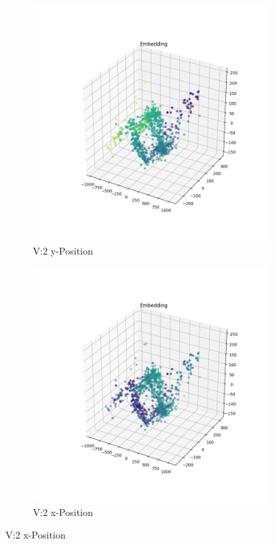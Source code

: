\begin{figure}[h]
	\begin{subfigure}[c]{0.49\textwidth}			
		\includegraphics[width=1\textwidth,center]{bilder/Hauptteil/MT_Grapple/EMB_alle/2_Embedding_y.png}
		\caption{V:2 y-Position}
		\label{img:Einbettung2_y}	
	\end{subfigure}
	\centering
	\begin{subfigure}[c]{0.49\textwidth}			
		\includegraphics[width=1\textwidth,center]{bilder/Hauptteil/MT_Grapple/EMB_alle/2_Embedding_x.png}
		\caption{V:2 x-Position}
		\label{img:Einbettung2_x}		
	\end{subfigure}
	

\end{figure}
